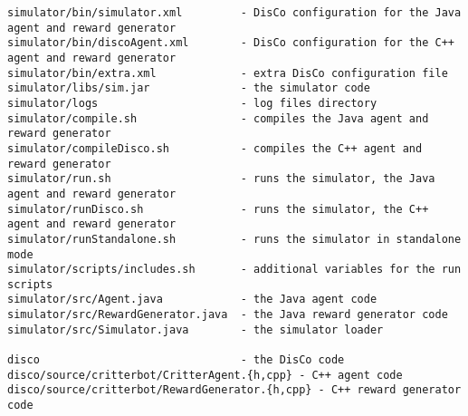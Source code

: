 \documentclass[12pt]{article}
\begin{document}
\footnotesize{
\begin{verbatim}
simulator/bin/simulator.xml         - DisCo configuration for the Java agent and reward generator
simulator/bin/discoAgent.xml        - DisCo configuration for the C++ agent and reward generator
simulator/bin/extra.xml             - extra DisCo configuration file 
simulator/libs/sim.jar              - the simulator code
simulator/logs                      - log files directory
simulator/compile.sh                - compiles the Java agent and reward generator
simulator/compileDisco.sh           - compiles the C++ agent and reward generator
simulator/run.sh                    - runs the simulator, the Java agent and reward generator
simulator/runDisco.sh               - runs the simulator, the C++ agent and reward generator
simulator/runStandalone.sh          - runs the simulator in standalone mode
simulator/scripts/includes.sh       - additional variables for the run scripts
simulator/src/Agent.java            - the Java agent code
simulator/src/RewardGenerator.java  - the Java reward generator code
simulator/src/Simulator.java        - the simulator loader

disco                               - the DisCo code
disco/source/critterbot/CritterAgent.{h,cpp} - C++ agent code
disco/source/critterbot/RewardGenerator.{h,cpp} - C++ reward generator code
\end{verbatim}
}
\end{document}
